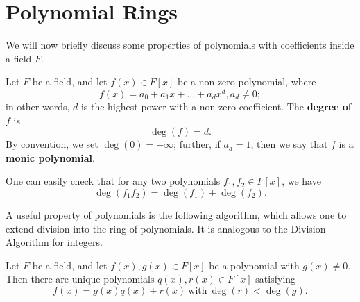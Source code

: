 \documentclass[math1530-lecture-notes]{subfiles}
\begin{document}
\section{Polynomial Rings}

We will now briefly discuss some properties of polynomials with coefficients inside a field $F$.
\begin{definition}[Degree of $f$]{}
  Let $F$ be a field, and let $f(x)\in F[x]$ be a non-zero polynomial, where \[
    f(x) = a_0+a_1x+\ldots+a_dx^d, a_d\neq 0
  ;\] in other words, $d$ is the highest power with a non-zero coefficient. The \textbf{degree of
  $f$} is \[
    \deg(f)=d
  .\] By convention, we set $\deg(0)=-\infty$; further, if $a_d=1$, then we say that $f$ is a
  \textbf{monic polynomial}.
\end{definition}

One can easily check that for any two polynomials $f_1,f_2\in F[x]$, we have \[
  \deg(f_1f_2)=\deg(f_1)+\deg(f_2)
.\] 

A useful property of polynomials is the following algorithm, which allows one to extend division
into the ring of polynomials. It is analogous to the Division Algorithm for integers.
\begin{proposition}{}
  Let $F$ be a field, and let $f(x),g(x)\in F[x]$ be a polynomial with $g(x)\neq 0$. Then there are
  unique polynomials $q(x),r(x)\in F[x]$ satisfying \[
    f(x)=g(x)q(x)+r(x) ~\text{with}~\deg(r) < \deg(g)
  .\] 
\end{proposition}
\end{document}
